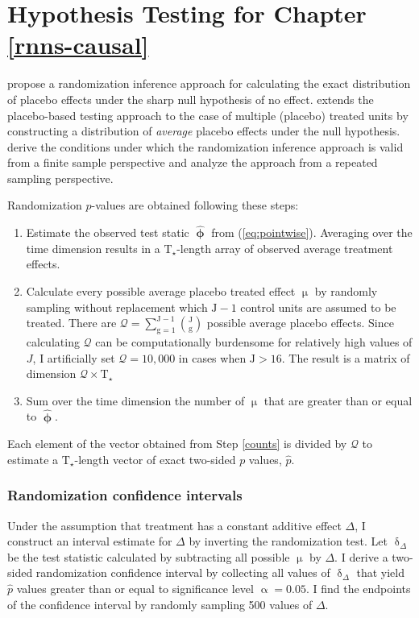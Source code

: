 \chapter{Hypothesis Testing for Chapter \ref{rnns-causal}} \label{eval}

\citet{abadie2010synthetic} propose a randomization inference approach for calculating the exact distribution of placebo effects under the sharp null hypothesis of no effect. \citet{cavallo2013catastrophic} extends the placebo-based testing approach to the case of multiple (placebo) treated units by constructing a distribution of \emph{average} placebo effects under the null hypothesis. \citet{firpo2018synthetic} derive the conditions under which the randomization inference approach is valid from a finite sample perspective and \citet{hahn2017synthetic} analyze the approach from a repeated sampling perspective.

Randomization $p$-values are obtained following these steps:

\begin{enumerate} 
	\item Estimate the observed test static $\boldsymbol{\hat{\upphi}}$ from (\ref{eq:pointwise}). Averaging over the time dimension results in a $\text{T}_\star$-length array of observed average treatment effects. 
	\item Calculate every possible average placebo treated effect $\upmu$ by randomly sampling without replacement which $\text{J}-1$ control units are assumed to be treated. There are $\mathcal{Q} = \sum\limits_{\text{g}=1}^{\text{J}-1} {\text{J} \choose \text{g}}$ possible average placebo effects. Since calculating $\mathcal{Q}$ can be computationally burdensome for relatively high values of $J$, I artificially set $\mathcal{Q} = 10,000$ in cases when $\text{J} > 16$. The result is a matrix of dimension $\mathcal{Q} \times \text{T}_\star$
	\item Sum over the time dimension the number of $\upmu$ that are greater than or equal to $\boldsymbol{\hat{\upphi}}$.  \label{counts}
\end{enumerate}

Each element of the vector obtained from Step \ref{counts} is divided by $\mathcal{Q}$ to estimate a $\text{T}_\star$-length vector of exact two-sided $p$ values, $\hat{p}$. 

\subsection{Randomization confidence intervals}

Under the assumption that treatment has a constant additive effect $\Delta$, I construct an interval estimate for $\Delta$ by inverting the randomization test. Let $\updelta_\Delta$ be the test statistic calculated by subtracting all possible $\upmu$ by $\Delta$. I derive a two-sided randomization confidence interval by collecting all values of $\updelta_\Delta$ that yield $\hat{p}$ values greater than or equal to significance level $\upalpha=0.05$. I find the endpoints of the confidence interval by randomly sampling 500 values of $\Delta$.